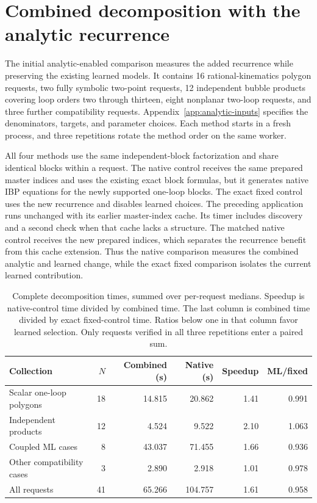 \section{Combined decomposition with the analytic recurrence}
\label{sec:analytic-results}
The initial analytic-enabled comparison measures the added recurrence while preserving the existing learned models. It contains 16 rational-kinematics polygon requests, two fully symbolic two-point requests, 12 independent bubble products covering loop orders two through thirteen, eight nonplanar two-loop requests, and three further compatibility requests. Appendix~\ref{app:analytic-inputs} specifies the denominators, targets, and parameter choices. Each method starts in a fresh process, and three repetitions rotate the method order on the same worker.

All four methods use the same independent-block factorization and share identical blocks within a request. The native control receives the same prepared master indices and uses the existing exact block formulas, but it generates native IBP equations for the newly supported one-loop blocks. The exact fixed control uses the new recurrence and disables learned choices. The preceding application runs unchanged with its earlier master-index cache. Its timer includes discovery and a second check when that cache lacks a structure. The matched native control receives the new prepared indices, which separates the recurrence benefit from this cache extension. Thus the native comparison measures the combined analytic and learned change, while the exact fixed comparison isolates the current learned contribution.

\begin{table}[!htbp]\centering\small
\caption{Complete decomposition times, summed over per-request medians. Speedup is native-control time divided by combined time. The last column is combined time divided by exact fixed-control time. Ratios below one in that column favor learned selection. Only requests verified in all three repetitions enter a paired sum.}
\label{tab:analytic-results}
\begin{tabular}{@{}lrrrrr@{}}\toprule
Collection & $N$ & Combined (s) & Native (s) & Speedup & ML/fixed\\\midrule
Scalar one-loop polygons & 18 & 14.815 & 20.862 & 1.41 & 0.991 \\
Independent products & 12 & 4.524 & 9.522 & 2.10 & 1.063 \\
Coupled ML cases & 8 & 43.037 & 71.455 & 1.66 & 0.936 \\
Other compatibility cases & 3 & 2.890 & 2.918 & 1.01 & 0.978 \\
All requests & 41 & 65.266 & 104.757 & 1.61 & 0.958 \\
\bottomrule\end{tabular}
\end{table}

